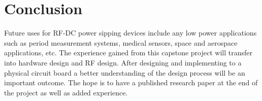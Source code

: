 \documentclass[12pt]{article}
\begin{document}
	\section{Conclusion}
	Future uses for RF-DC power sipping devices include any low power applications such as period measurement systems, medical sensors, space and aerospace applications, etc. The experience gained from this capstone project will transfer into hardware design and RF design. After designing and implementing to a physical circuit board a better understanding of the design process will be an important outcome. The hope is to have a published research paper at the end of the project as well as added experience.
	
	\newpage\label{bibliography}
	\nocite{*}
	\printbibliography
	
\end{document}

